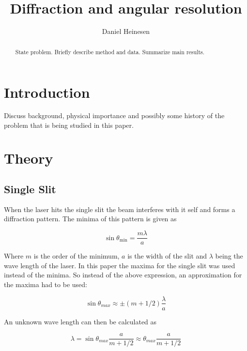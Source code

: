 \documentclass{emulateapj}
\begin{document}
\title{Diffraction and angular resolution}

\author{Daniel Heinesen}





\begin{abstract}
  State problem. Briefly describe method and data. Summarize main results.
\end{abstract}

\section{Introduction}
\label{sec:introduction}

Discuss background, physical importance and possibly some history of
the problem that is being studied in this paper.

\section{Theory}
\label{sec:theory}
\subsection{Single Slit}
When the laser hits the single slit the beam interferes with it self and forms a diffraction pattern. The minima of this pattern is given as 

\begin{equation}
\sin \theta_{\min} = \frac{m\lambda}{a}
\end{equation}

Where $m$ is the order of the minimum, $a$ is the width of the slit and $\lambda$ being the wave length of the laser. In this paper the maxima for the single slit was used instead of the minima. So instead of the above expression, an approximation for the maxima had to be used:

\begin{equation}
\sin \theta_{max} \approx \pm (m+1/2)\frac{\lambda}{a}
\end{equation}\label{eq:slitMax}

An unknown wave length can then be calculated as

\begin{equation}
\lambda = \sin \theta_{max}\frac{a}{m+1/2} \approx \theta_{max}\frac{a}{m+1/2}
\end{equation}
\end{document}
